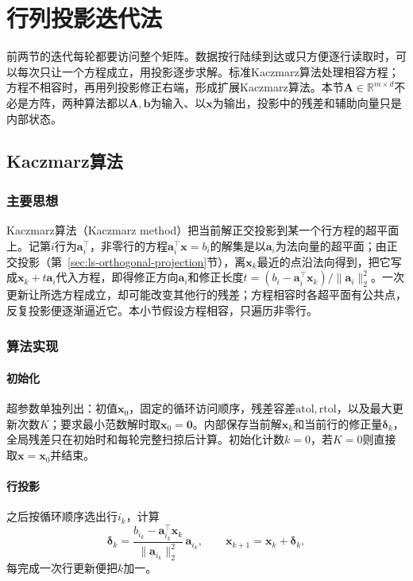\section{行列投影迭代法}
\label{sec:ls-row-projection}

前两节的迭代每轮都要访问整个矩阵。数据按行陆续到达或只方便逐行读取时，可以每次只让一个方程成立，用投影逐步求解。标准Kaczmarz算法处理相容方程；方程不相容时，再用列投影修正右端，形成扩展Kaczmarz算法。本节$\bm A\in\mathbb R^{m\times d}$不必是方阵，两种算法都以$\bm A,\bm b$为输入、以$\bm x$为输出，投影中的残差和辅助向量只是内部状态。

\subsection{Kaczmarz算法}
\label{sec:ls-kaczmarz}

\subsubsection{主要思想}

Kaczmarz算法（Kaczmarz method）把当前解正交投影到某一个行方程的超平面上。记第$i$行为$\bm a_i^\top$，非零行的方程$\bm a_i^\top\bm x=b_i$的解集是以$\bm a_i$为法向量的超平面；由正交投影（第~\ref{sec:ls-orthogonal-projection}节），离$\bm x_k$最近的点沿法向得到，把它写成$\bm x_k+t\bm a_i$代入方程，即得修正方向$\bm a_i$和修正长度$t=(b_i-\bm a_i^\top\bm x_k)/\lVert\bm a_i\rVert_2^2$。一次更新让所选方程成立，却可能改变其他行的残差；方程相容时各超平面有公共点，反复投影便逐渐逼近它。本小节假设方程相容，只遍历非零行。

\subsubsection{算法实现}

\paragraph{初始化}
超参数单独列出：初值$\bm x_0$，固定的循环访问顺序，残差容差$\mathrm{atol},\mathrm{rtol}$，以及最大更新次数$K$；要求最小范数解时取$\bm x_0=\bm 0$。内部保存当前解$\bm x_k$和当前行的修正量$\bm\delta_k$，全局残差只在初始时和每轮完整扫掠后计算。初始化计数$k=0$，若$K=0$则直接取$\bm x=\bm x_0$并结束。

\paragraph{行投影}
之后按循环顺序选出行$i_k$，计算
\[
\bm\delta_k=\frac{b_{i_k}-\bm a_{i_k}^\top\bm x_k}{\lVert\bm a_{i_k}\rVert_2^2}\,\bm a_{i_k},\qquad
\bm x_{k+1}=\bm x_k+\bm\delta_k ,
\]
每完成一次行更新便把$k$加一。

